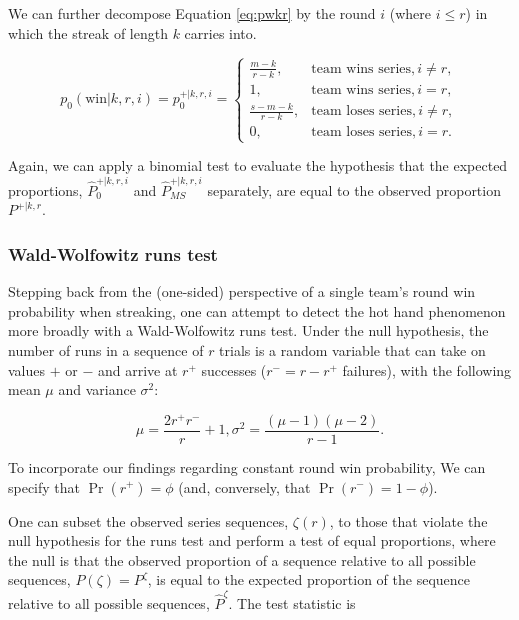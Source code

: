 \documentclass{article}
\begin{document}
We can further decompose Equation \ref{eq:pwkr} by the round \(i\)
(where \(i \leq r\)) in which the streak of length \(k\) carries into.

\begin{equation}\label{eq:pwkri}
p_0(\text{win} | k, r, i) = p^{+|k,r,i}_0 = \begin{cases}
  \frac{m - k}{r - k}, & \text{team wins series}, i \neq r, \\
  1, & \text{team wins series}, i = r, \\
  \frac{s - m - k}{r - k}, & \text{team loses series}, i \neq r, \\
  0, & \text{team loses series}, i = r.
\end{cases}
\end{equation}

Again, we can apply a binomial test to evaluate the hypothesis that the
expected proportions, \(\hat{P}^{+|k,r,i}_0\) and
\(\hat{P}^{+|k,r,i}_{MS}\) separately, are equal to the observed
proportion \(P^{+|k,r}\).

\hypertarget{wald-wolfowitz-runs-test}{%
\subsubsection{Wald-Wolfowitz runs
test}\label{wald-wolfowitz-runs-test}}

Stepping back from the (one-sided) perspective of a single team's round
win probability when streaking, one can attempt to detect the hot hand
phenomenon more broadly with a Wald-Wolfowitz runs test. Under the null
hypothesis, the number of runs in a sequence of \(r\) trials is a random
variable that can take on values \(+\) or \(-\) and arrive at \(r^+\)
successes (\(r^- = r - r^+\) failures), with the following mean \(\mu\)
and variance \(\sigma^2\):

\begin{equation}\label{eq:ww}
\mu = \frac{2r^{+}r^{-}}{r} + 1, \sigma^2 = \frac{(\mu-1)(\mu-2)}{r-1}.
\end{equation}

To incorporate our findings regarding constant round win probability, We
can specify that \(\Pr(r^+) = \phi\) (and, conversely, that
\(\Pr(r^-) = 1 - \phi\)).

One can subset the observed series sequences, \(\zeta(r)\), to those
that violate the null hypothesis for the runs test and perform a test of
equal proportions, where the null is that the observed proportion of a
sequence relative to all possible sequences, \(P(\zeta) = P^\zeta\), is
equal to the expected proportion of the sequence relative to all
possible sequences, \(\hat{P}^\zeta\). The test statistic is
\end{document}
